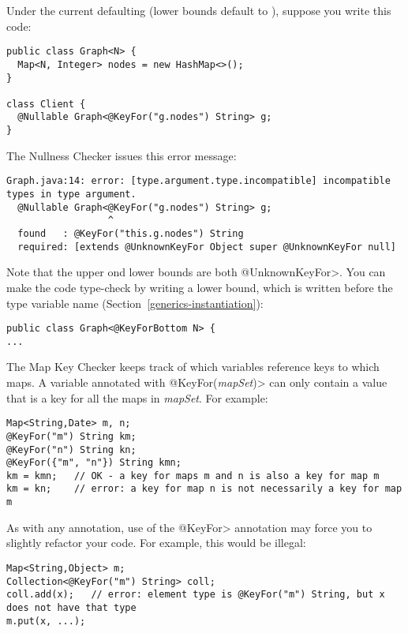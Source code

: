 Under the current defaulting (lower bounds default to
), suppose you write this code:

\begin{Verbatim}
public class Graph<N> {
  Map<N, Integer> nodes = new HashMap<>();
}

class Client {
  @Nullable Graph<@KeyFor("g.nodes") String> g;
}
\end{Verbatim}

\noindent
The Nullness Checker issues this error message:

\begin{Verbatim}
Graph.java:14: error: [type.argument.type.incompatible] incompatible types in type argument.
  @Nullable Graph<@KeyFor("g.nodes") String> g;
                  ^
  found   : @KeyFor("this.g.nodes") String
  required: [extends @UnknownKeyFor Object super @UnknownKeyFor null]
\end{Verbatim}

Note that the upper ond lower bounds are both \<@UnknownKeyFor>.  You can
make the code type-check by writing a lower bound, which is written before
the type variable name (Section~\ref{generics-instantiation}):

\begin{Verbatim}
public class Graph<@KeyForBottom N> {
...
\end{Verbatim}



The Map Key Checker keeps track of which variables reference keys to
which maps.  A variable annotated with \<@KeyFor(\emph{mapSet})> can only
contain a value that is a key for all the maps in \emph{mapSet}.  For example:

\begin{verbatim}
Map<String,Date> m, n;
@KeyFor("m") String km;
@KeyFor("n") String kn;
@KeyFor({"m", "n"}) String kmn;
km = kmn;   // OK - a key for maps m and n is also a key for map m
km = kn;    // error: a key for map n is not necessarily a key for map m
\end{verbatim}


As with any annotation, use of the \<@KeyFor> annotation may force you to
slightly refactor your code.  For example, this would be illegal:

\begin{verbatim}
Map<String,Object> m;
Collection<@KeyFor("m") String> coll;
coll.add(x);   // error: element type is @KeyFor("m") String, but x does not have that type
m.put(x, ...);
\end{verbatim}

